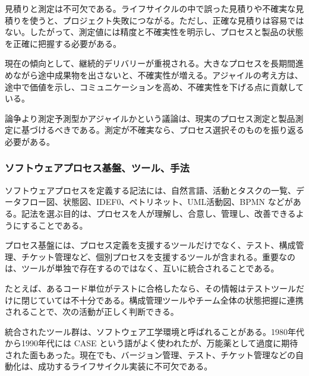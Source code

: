 見積りと測定は不可欠である。ライフサイクルの中で誤った見積りや不確実な見積りを使うと、プロジェクト失敗につながる。ただし、正確な見積りは容易ではない。したがって、測定値には精度と不確実性を明示し、プロセスと製品の状態を正確に把握する必要がある。

現在の傾向として、継続的デリバリーが重視される。大きなプロセスを長期間進めながら途中成果物を出さないと、不確実性が増える。アジャイルの考え方は、途中で価値を示し、コミュニケーションを高め、不確実性を下げる点に貢献している。

\begin{pointbox}{論争より測定}予測型かアジャイルかという議論は、現実のプロセス測定と製品測定に基づけるべきである。測定が不確実なら、プロセス選択そのものを振り返る必要がある。\end{pointbox}
\subsubsection{ソフトウェアプロセス基盤、ツール、手法}
ソフトウェアプロセスを定義する記法には、自然言語、活動とタスクの一覧、データフロー図、状態図、IDEF0、ペトリネット、UML活動図、BPMN などがある。記法を選ぶ目的は、プロセスを人が理解し、合意し、管理し、改善できるようにすることである。

プロセス基盤には、プロセス定義を支援するツールだけでなく、テスト、構成管理、チケット管理など、個別プロセスを支援するツールが含まれる。重要なのは、ツールが単独で存在するのではなく、互いに統合されることである。

たとえば、あるコード単位がテストに合格したなら、その情報はテストツールだけに閉じていては不十分である。構成管理ツールやチーム全体の状態把握に連携されることで、次の活動が正しく判断できる。

統合されたツール群は、ソフトウェア工学環境と呼ばれることがある。1980年代から1990年代には CASE という語がよく使われたが、万能薬として過度に期待された面もあった。現在でも、バージョン管理、テスト、チケット管理などの自動化は、成功するライフサイクル実装に不可欠である。

